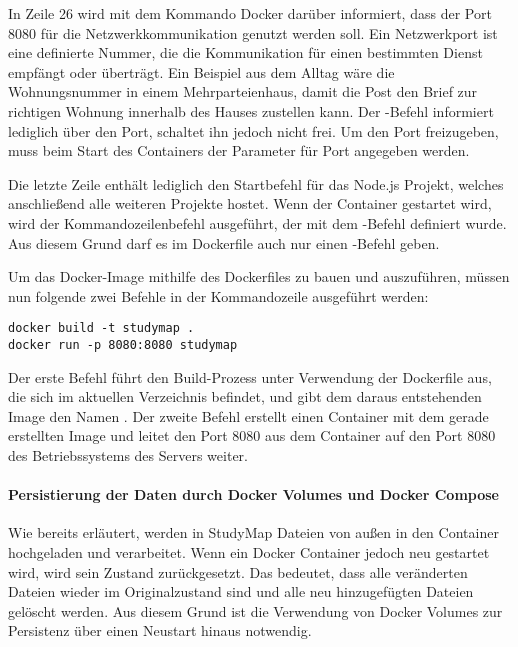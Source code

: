 In Zeile 26 wird mit dem Kommando  Docker darüber informiert, dass der Port 8080 für die Netzwerkkommunikation genutzt werden soll. Ein Netzwerkport ist eine definierte Nummer, die die Kommunikation für einen bestimmten Dienst empfängt oder überträgt. \parencite{wright_was_2022} Ein Beispiel aus dem Alltag wäre die Wohnungsnummer in einem Mehrparteienhaus, damit die Post den Brief zur richtigen Wohnung innerhalb des Hauses zustellen kann. Der -Befehl informiert lediglich über den Port, schaltet ihn jedoch nicht frei. Um den Port freizugeben, muss beim Start des Containers der Parameter  für Port angegeben werden. \parencite{docker_inc_dockerfile_2024}

Die letzte Zeile enthält lediglich den Startbefehl für das Node.js Projekt, welches anschließend alle weiteren Projekte hostet. Wenn der Container gestartet wird, wird der Kommandozeilenbefehl ausgeführt, der mit dem -Befehl definiert wurde. Aus diesem Grund darf es im Dockerfile auch nur einen -Befehl geben. \parencite{docker_inc_dockerfile_2024}

Um das Docker-Image mithilfe des Dockerfiles zu bauen und auszuführen, müssen nun folgende zwei Befehle in der Kommandozeile ausgeführt werden:
\begin{lstlisting}[style=Python]
docker build -t studymap .
docker run -p 8080:8080 studymap
\end{lstlisting}

Der erste Befehl führt den Build-Prozess unter Verwendung der Dockerfile aus, die sich im aktuellen Verzeichnis befindet, und gibt dem daraus entstehenden Image den Namen . Der zweite Befehl erstellt einen Container mit dem gerade erstellten Image und leitet den Port 8080 aus dem Container auf den Port 8080 des Betriebssystems des Servers weiter.

\paragraph*{Persistierung der Daten durch Docker Volumes und Docker Compose}
Wie bereits erläutert, werden in StudyMap Dateien von außen in den Container hochgeladen und verarbeitet. Wenn ein Docker Container jedoch neu gestartet wird, wird sein Zustand zurückgesetzt. Das bedeutet, dass alle veränderten Dateien wieder im Originalzustand sind und alle neu hinzugefügten Dateien gelöscht werden. Aus diesem Grund ist die Verwendung von Docker Volumes zur Persistenz über einen Neustart hinaus notwendig.

